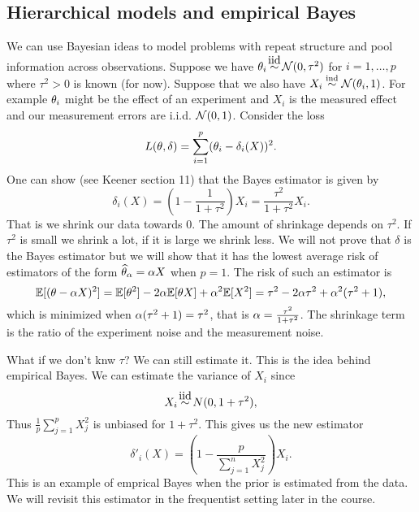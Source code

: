 \subsection{Hierarchical models and empirical Bayes}
We can use Bayesian ideas to model problems with repeat structure and pool information across observations. Suppose we have $\ta_i \iid \Na(0,\tau^2)$ for $i=1,\ldots,p$ where $\tau^2 > 0$ is known (for now). Suppose that we also have $X_i \stackrel{\text{ind}}{\sim} {{\mathcal{N}}}({\theta}_i,1)$. For example ${\theta}_i$ might be the effect of an experiment and $X_i$ is the measured effect and our measurement errors are i.i.d. ${{\mathcal{N}}}(0,1)$. Consider the loss
\[L({\theta},\delta) = \sum_{i=1}^p({\theta}_i-\delta_i(X))^2. \]
One can show (see Keener section 11) that the Bayes estimator is given by 
\[\delta_i(X) = \left(1-\frac{1}{1+\tau^2}\right)X_i = \frac{\tau^2}{1+\tau^2}X_i. \]
That is we shrink our data towards 0. The amount of shrinkage depends on $\tau^2$. If $\tau^2$ is small we shrink a lot, if it is large we shrink less. We will not prove that $\delta$ is the Bayes estimator but we will show that it has the lowest average risk of estimators of the form $\widehat{{\theta}}_{\alpha} = {\alpha} X$ when $p=1$. The risk of such an estimator is
\[{\mathbb{E}}[({\theta}-{\alpha} X)^2] = {\mathbb{E}}[{\theta}^2]-2{\alpha}{\mathbb{E}}[{\theta} X]+{\alpha}^2{\mathbb{E}}[X^2] = \tau^2-2{\alpha} \tau^2+{\alpha}^2(\tau^2+1), \]
which is minimized when ${\alpha}(\tau^2+1)=\tau^2$, that is ${\alpha} = \frac{\tau^2}{1+\tau^2}$. The shrinkage term is the ratio of the experiment noise and the measurement noise. 

What if we don't knw $\tau$? We can still estimate it. This is the idea behind empirical Bayes. We can estimate the variance of $X_i$ since 
\[X_i \iid N(0,1+\tau^2),  \]
Thus $\frac{1}{p}\sum_{j=1}^p X_j^2$ is unbiased for $1+\tau^2$. This gives us the new estimator
\[\delta'_i(X) = \left(1-\frac{p}{\sum_{j=1}^n X_j^2}\right)X_i. \]
This is an example of emprical Bayes when the prior is estimated from the data. We will revisit this estimator in the frequentist setting later in the course.
